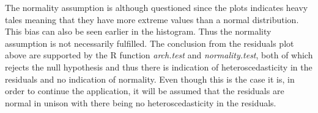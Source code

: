 \noindent The normality assumption is although questioned since the plots indicates heavy tales meaning that they have more extreme values than a normal distribution. This bias can also be seen earlier in the histogram. Thus the normality assumption is not necessarily fulfilled. The conclusion from the residuals plot above are supported by the R function \textit{arch.test} and \textit{normality.test}, both of which rejects the null hypothesis  and thus there is indication of heteroscedasticity in the residuals and no indication of normality. Even though this is the case it is, in order to continue the application, it will be assumed that the residuals are normal in unison with there being no heteroscedasticity in the residuals.